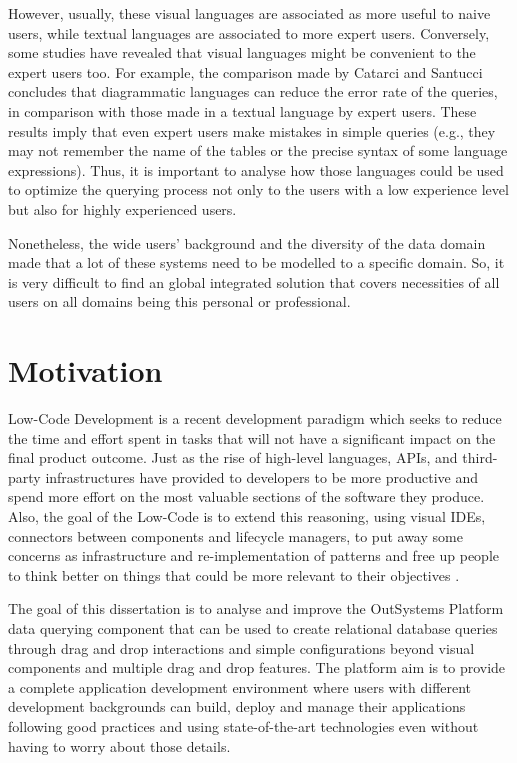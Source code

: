 However, usually, these visual languages are associated as more useful to naive users, while textual languages are associated to more expert users.  Conversely, some studies have revealed that visual languages might be convenient to the expert users too. For example, the comparison made by Catarci and Santucci \cite{diagrammaticVsTextualQueryLanguages_aComparativeExperiment} concludes that diagrammatic languages can reduce the error rate of the queries, in comparison with those made in a textual language by expert users. These results imply that even expert users make mistakes in simple queries (e.g., they may not remember the name of the tables or the precise syntax of some language expressions). Thus, it is important to analyse how those languages could be used to optimize the querying process not only to the users with a low experience level but also for highly experienced users.

 Nonetheless, the wide users’ background and the diversity of the data domain made that a lot of these systems need to be modelled to a specific domain. So, it is very difficult to find an global integrated solution that covers necessities of all users on all domains being this personal or professional.

\section{Motivation}
\label{sec:motivation}

Low-Code Development is a recent development paradigm which seeks to reduce the time and effort spent in tasks that will not have a significant impact on the final product outcome. Just as the rise of high-level languages, APIs, and third-party infrastructures have provided to developers to be more productive and spend more effort on the most valuable sections of the software they produce. Also, the goal of the Low-Code is to extend this reasoning, using visual IDEs, connectors between components and lifecycle managers, to put away some concerns as infrastructure and re-implementation of patterns and free up people to think better on things that could be more relevant to their objectives \cite{outsystems_whatIsLowCode}.

The goal of this dissertation is to analyse and improve the OutSystems Platform \cite{outsystemsPlatform} data querying component that can be used to create relational database queries through drag and drop interactions and simple configurations beyond visual components and multiple drag and drop features. The platform aim is to provide a complete application development environment where users with different development backgrounds can build, deploy and manage their applications following good practices and using state-of-the-art technologies even without having to worry about those details.

